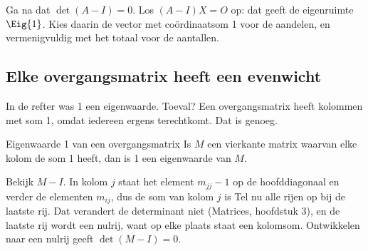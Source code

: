 
\begin{werkwijze}
Ga na dat $\det(A - I) = 0$. Los $(A - I)X = O$ op: dat geeft de eigenruimte $\Eig{1}$. Kies daarin de vector met coördinaatsom 1 voor de aandelen, en vermenigvuldig met het totaal voor de aantallen.
\end{werkwijze}


\begin{oefeningen}
\end{oefeningen}

\subsection{Elke overgangsmatrix heeft een evenwicht}

In de refter was 1 een eigenwaarde. Toeval? Een overgangsmatrix heeft kolommen met som 1, omdat iedereen ergens terechtkomt. Dat is genoeg.

\begin{theorie}
\begin{stelling}{Eigenwaarde 1 van een overgangsmatrix}
Is $M$ een vierkante matrix waarvan elke kolom de som 1 heeft, dan is 1 een eigenwaarde van $M$.
\end{stelling}

\begin{bewijs}
Bekijk $M - I$. In kolom $j$ staat het element $m_{jj} - 1$ op de hoofddiagonaal en verder de elementen $m_{ij}$, dus de som van kolom $j$ is
Tel nu alle rijen op bij de laatste rij. Dat verandert de determinant niet (Matrices, hoofdstuk 3), en de laatste rij wordt een nulrij, want op elke plaats staat een kolomsom. Ontwikkelen naar een nulrij geeft $\det(M - I) = 0$.
\end{bewijs}
\end{theorie}

